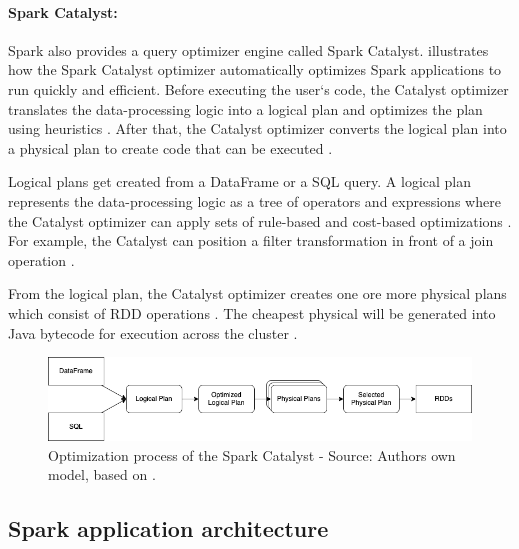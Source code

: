 \paragraph{Spark Catalyst:}
Spark also provides a query optimizer engine called Spark Catalyst.  illustrates how the Spark Catalyst optimizer automatically optimizes Spark applications to run quickly and efficient.
Before executing the user`s code, the Catalyst optimizer translates the data-processing logic into a logical plan and optimizes the plan using heuristics \cite{Hien2018Spark}. After that, the Catalyst optimizer converts the logical plan into a physical plan to create code that can be executed \cite{Hien2018Spark}.


Logical plans get created from a DataFrame or a SQL query. A logical plan represents the data-processing logic as a tree of operators and expressions where the Catalyst optimizer can apply sets of rule-based and cost-based optimizations \cite{Hien2018Spark}.
For example, the Catalyst can position a filter transformation in front of a join operation \cite{Hien2018Spark}.

From the logical plan, the Catalyst optimizer creates one ore more physical plans which consist of RDD operations \cite{Chambers2018Spark}. The cheapest physical will be generated into Java bytecode for execution across the cluster \cite{Hien2018Spark}.

\begin{figure}[h]%
\centering
\includegraphics[scale=0.5]{images/03_background/spark_catalyst}%
\caption{Optimization process of the Spark Catalyst - Source: Authors own model, based on \cite{Hien2018Spark}.}%
\label{fig:spark_catalyst_process}%
\end{figure}


\subsection{Spark application architecture}


